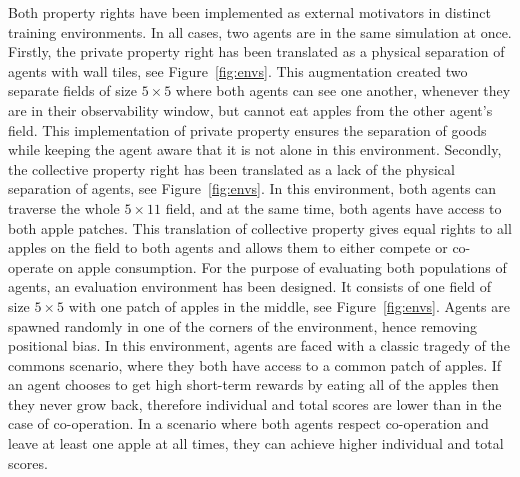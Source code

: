 \documentclass[pdflatex,sn-basic,lineno]{sn-jnl}
\theoremstyle{thmstyleone}%
\theoremstyle{thmstyletwo}%
\theoremstyle{thmstylethree}%
\begin{document}
Both property rights have been implemented as external motivators in distinct training environments. In all cases, two
agents are in the same simulation at once. Firstly, the private property right has been translated as a physical
separation of agents with wall tiles, see Figure~\ref{fig:envs}. This augmentation created two separate fields of size
$5\times5$ where both agents can see one another, whenever they are in their observability window, but cannot eat apples
from the other agent's field. This implementation of private property ensures the separation of goods while keeping the
agent aware that it is not alone in this environment. Secondly, the collective property right has been translated as a
lack of the physical separation of agents, see Figure~\ref{fig:envs}. In this environment, both agents can traverse the
whole $5\times11$ field, and at the same time, both agents have access to both apple patches. This translation of
collective property gives equal rights to all apples on the field to both agents and allows them to either compete or
co-operate on apple consumption. For the purpose of evaluating both populations of agents, an evaluation environment has
been designed. It consists of one field of size $5\times5$ with one patch of apples in the middle, see
Figure~\ref{fig:envs}. Agents are spawned randomly in one of the corners of the environment, hence removing positional
bias. In this environment, agents are faced with a classic tragedy of the commons scenario, where they both have access
to a common patch of apples. If an agent chooses to get high short-term rewards by eating all of the apples then they
never grow back, therefore individual and total scores are lower than in the case of co-operation. In a scenario where
both agents respect co-operation and leave at least one apple at all times, they can achieve higher individual and total
scores.
\end{document}
